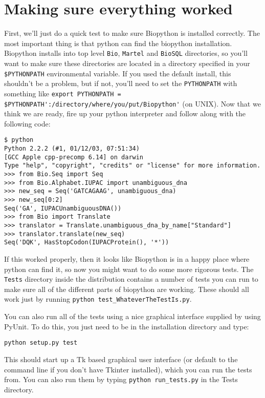 \documentclass{article}
\begin{document}
\section{Making sure everything worked}
\label{sec:is_working}

First, we'll just do a quick test to make sure Biopython is installed correctly. The most important thing is that python can find the biopython installation. Biopython installs into top level \verb|Bio|, \verb|Martel| and \verb|BioSQL| directories, so you'll want to make sure these directories are located in a directory specified 
in your\verb| $PYTHONPATH| environmental variable. If you used the default install, this shouldn't be a problem, but if not, you'll need to set the \verb|PYTHONPATH| with something like \verb|export PYTHONPATH = $PYTHONPATH':/directory/where/you/put/Biopython'| (on UNIX). Now that we think we are ready, fire up your python interpreter and follow along with the following code:

\begin{verbatim}
$ python
Python 2.2.2 (#1, 01/12/03, 07:51:34) 
[GCC Apple cpp-precomp 6.14] on darwin
Type "help", "copyright", "credits" or "license" for more information.
>>> from Bio.Seq import Seq
>>> from Bio.Alphabet.IUPAC import unambiguous_dna
>>> new_seq = Seq('GATCAGAAG', unambiguous_dna)
>>> new_seq[0:2]
Seq('GA', IUPACUnambiguousDNA())
>>> from Bio import Translate
>>> translator = Translate.unambiguous_dna_by_name["Standard"]
>>> translator.translate(new_seq)
Seq('DQK', HasStopCodon(IUPACProtein(), '*'))
\end{verbatim}

If this worked properly, then it looks like Biopython is in a happy place where python can find it, so now you might want to do some more rigorous tests. The \verb|Tests| directory inside the distribution contains a number of tests you can run to make sure all of the different parts of biopython are working. These should all work just by running \verb|python test_WhateverTheTestIs.py|. 


You can also run all of the tests using a nice graphical interface supplied by using PyUnit. To do this, you just need to be in the installation directory and type:

\begin{verbatim}
python setup.py test
\end{verbatim}

This should start up a Tk based graphical user interface (or default to the command line if you don't have Tkinter installed), which you can run the tests from. You can also run them by typing \verb|python run_tests.py| in the Tests directory.
\end{document}
